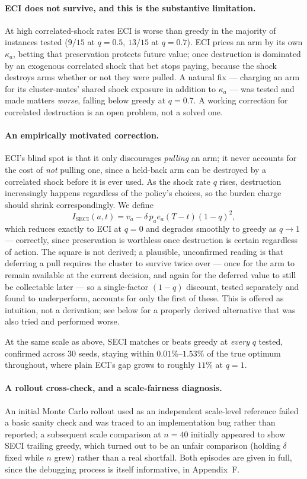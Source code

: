 \paragraph{ECI does not survive, and this is the substantive limitation.} At high
correlated-shock rates ECI is worse than greedy in the majority of instances
tested ($9/15$ at $q=0.5$, $13/15$ at $q=0.7$). ECI prices an arm by its own
$\kappa_a$, betting that preservation protects future value; once destruction is
dominated by an exogenous correlated shock that bet stops paying, because the
shock destroys arms whether or not they were pulled. A natural fix --- charging an
arm for its cluster-mates' shared shock exposure in addition to $\kappa_a$ --- was
tested and made matters \emph{worse}, falling below greedy at $q=0.7$. A working
correction for correlated destruction is an open problem, not a solved one.

\paragraph{An empirically motivated correction.} ECI's blind spot is that it only discourages
\emph{pulling} an arm; it never accounts for the cost of \emph{not} pulling one,
since a held-back arm can be destroyed by a correlated shock before it is ever
used. As the shock rate $q$ rises, destruction increasingly happens regardless of
the policy's choices, so the burden charge should shrink correspondingly. We
define
\[
I_{\mathrm{SECI}}(a,t) = v_a - \delta\, p_a e_a (T-t)(1-q)^2,
\]
which reduces exactly to ECI at $q=0$ and degrades smoothly to greedy as
$q\to1$ --- correctly, since preservation is worthless once destruction is
certain regardless of action. The square is not derived; a plausible, unconfirmed
reading is that deferring a pull requires the cluster to survive twice over ---
once for the arm to remain available at the current decision, and again for
the deferred value to still be collectable later --- so a single-factor
$(1-q)$ discount, tested separately and found to underperform, accounts for only
the first of these. This is offered as intuition, not a derivation; see below
for a properly derived alternative that was also tried and performed worse.

At the same scale as above, SECI matches or beats greedy at \emph{every} $q$
tested, confirmed across 30 seeds, staying within $0.01\%$--$1.53\%$ of the true
optimum throughout, where plain ECI's gap grows to roughly $11\%$ at $q=1$.

\paragraph{A rollout cross-check, and a scale-fairness diagnosis.} An initial
Monte Carlo rollout used as an independent scale-level reference failed a
basic sanity check and was traced to an implementation bug rather than
reported; a subsequent scale comparison at $n=40$ initially appeared to show
SECI trailing greedy, which turned out to be an unfair comparison (holding
$\delta$ fixed while $n$ grew) rather than a real shortfall. Both episodes are
given in full, since the debugging process is itself informative, in
Appendix~F.

